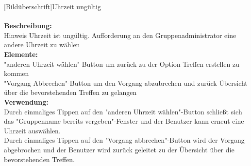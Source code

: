 [Bildüberschrift]Uhrzeit ungültig\\ \\
\textbf{Beschreibung:}\\
Hinweis Uhrzeit ist ungültig. Aufforderung an den Gruppenadministrator eine andere Uhrzeit zu wählen\\
\textbf{Elemente:}\\
"anderen Uhrzeit wählen"-Button um zurück zu der Option Treffen erstellen zu kommen\\
"Vorgang Abbrechen"-Button um den Vorgang abzubrechen und zurück Übersicht über die bevorstehenden Treffen zu gelangen\\
\textbf{Verwendung:}\\
Durch einmaliges Tippen auf den "anderen Uhrzeit wählen"-Button schließt sich das "Gruppenname bereits vergeben"-Fenster und der Benutzer kann erneut eine Uhrzeit auswählen.\\
Durch einmaliges Tippen auf den "Vorgang abbrechen"-Button wird der Vorgang abgebrochen und der Benutzer wird zurück geleitet zu der Übersicht über die bevorstehenden Treffen.\\ \\

